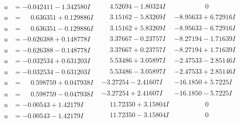 \documentclass[1p]{elsarticle_modified}
\theoremstyle{definition}
\begin{document}
$$\begin{array}{c|c|c}
\begin{aligned}
u &= -0.042411 - 1.342580 I\end{aligned}
 & \phantom{-}4.52694 - 1.80324 I & \phantom{-0.000000 } 0 \\ \hline\begin{aligned}
u &= \phantom{-}0.636351 + 0.129886 I\end{aligned}
 & \phantom{-}3.15162 - 5.83269 I & -8.95633 + 6.72916 I \\ \hline\begin{aligned}
u &= \phantom{-}0.636351 - 0.129886 I\end{aligned}
 & \phantom{-}3.15162 + 5.83269 I & -8.95633 - 6.72916 I \\ \hline\begin{aligned}
u &= -0.626388 + 0.148778 I\end{aligned}
 & \phantom{-}3.37667 - 0.23757 I & -8.27194 - 1.71639 I \\ \hline\begin{aligned}
u &= -0.626388 - 0.148778 I\end{aligned}
 & \phantom{-}3.37667 + 0.23757 I & -8.27194 + 1.71639 I \\ \hline\begin{aligned}
u &= -0.032534 + 0.631203 I\end{aligned}
 & \phantom{-}5.53486 + 3.05897 I & -2.47533 - 2.85146 I \\ \hline\begin{aligned}
u &= -0.032534 - 0.631203 I\end{aligned}
 & \phantom{-}5.53486 - 3.05897 I & -2.47533 + 2.85146 I \\ \hline\begin{aligned}
u &= \phantom{-}0.598759 + 0.047938 I\end{aligned}
 & -3.27254 - 2.41607 I & -16.1850 + 5.7225 I \\ \hline\begin{aligned}
u &= \phantom{-}0.598759 - 0.047938 I\end{aligned}
 & -3.27254 + 2.41607 I & -16.1850 - 5.7225 I \\ \hline\begin{aligned}
u &= -0.00543 + 1.42179 I\end{aligned}
 & \phantom{-}11.72350 + 3.15804 I & \phantom{-0.000000 } 0 \\ \hline\begin{aligned}
u &= -0.00543 - 1.42179 I\end{aligned}
 & \phantom{-}11.72350 - 3.15804 I & \phantom{-0.000000 } 0 \\ \hline\begin{aligned}

\end{aligned}
\end{array}$$
\end{document}
